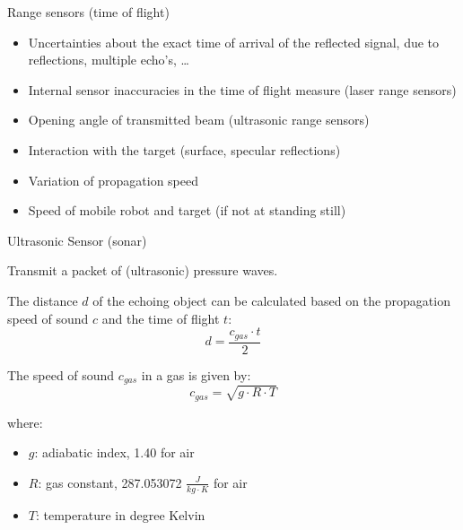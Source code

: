\documentclass[compress]{beamer}
\begin{document}
\begin{frame}{Range sensors (time of flight)}
{\begin{itemize}
\item Uncertainties about the exact time of arrival of the reflected signal,
  due to reflections, multiple echo's, \ldots{}
\item Internal sensor inaccuracies in the time of flight measure (laser
  range sensors)
\item Opening angle of transmitted beam (ultrasonic range sensors)
\item Interaction with the target (surface, specular reflections)
\item Variation of propagation speed
\item Speed of mobile robot and target (if not at standing still)
\end{itemize}
}

\end{frame}

\begin{frame}{Ultrasonic Sensor (sonar)}


  Transmit a packet of (ultrasonic) pressure waves.

  The distance $d$ of the echoing object can be calculated based on the
  propagation speed of sound $c$ and the time of flight $t$:
        \[
            d = \frac{c_{gas}\cdot t}{2}
        \]

    The speed of sound $c_{gas}$ in a gas is given by:
        \[
            c_{gas} = \sqrt{g\cdot R\cdot T}
        \]

    where:

    \begin{itemize}
        \item  $g$: adiabatic index, 1.40 for air
        \item $R$: gas constant, 287.053072 $\frac{J}{kg\cdot K}$ for air
        \item $T$: temperature in degree Kelvin

    \end{itemize}

\end{frame}
\end{document}
